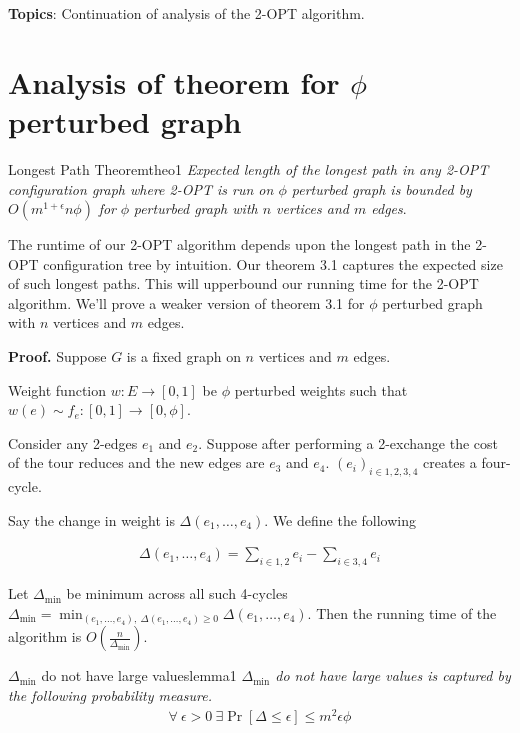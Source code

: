 \documentclass[12pt, a4paper]{article}
\begin{document}
\MakeScribeTop

\textbf{Topics}: Continuation of analysis of the 2-{\sf OPT} algorithm.

\section{Analysis of theorem for $\phi$ perturbed graph}

\begin{theo}{Longest Path Theorem}{theo1}
    \textit{Expected length of the longest path in any 2-{\sf OPT}
    configuration graph where 2-{\sf OPT} is run on $\phi$ perturbed graph
    is bounded by} $O(m^{1 + \epsilon} n \phi)$ \textit{for} $\phi$ \textit{perturbed graph
        with $n$ vertices and $m$ edges}.

\end{theo}

\noindent The runtime of our 2-{\sf OPT} algorithm depends upon the
longest path in the 2-{\sf OPT} configuration tree by intuition.
Our theorem 3.1 captures the expected size of such longest paths.
This will upperbound our running time for the 2-{\sf OPT} algorithm.
We'll prove a weaker version of theorem 3.1 for $\phi$ perturbed graph with $n$ vertices and $m$ edges.

\bigskip

\noindent \textbf{Proof.} Suppose $G$ is a fixed graph on $n$ vertices and $m$ edges.

\noindent Weight function $w:E \to [0,1]$ be $\phi$ perturbed weights such that $w(e) \sim f_e:[0,1] \to [0, \phi]$.

\noindent Consider any 2-edges $e_1$ and $e_2$. Suppose after performing a 2-exchange the cost of the tour reduces and the new edges are $e_3$ and $e_4$. $(e_i)_{i \in {1,2,3,4}}$ creates a four-cycle.

\noindent Say the change in weight is $\Delta(e_1, \dots, e_4)$. We define the following

\begin{align*}
    \Delta(e_1, \dots, e_4) = \displaystyle\sum_{i \in {1,2}} e_i - \displaystyle\sum_{i \in {3,4}} e_i
\end{align*}

\noindent Let $\Delta_{\text{min}}$ be minimum across all such 4-cycles $\Delta_{\text{min}} = \min_{(e_1, \dots, e_4), \: \Delta(e_1, \dots, e_4) \geq 0} \Delta(e_1, \dots, e_4)$.
Then the running time of the algorithm is $O(\frac{n}{\Delta_{\text{min}}})$.

\begin{lemma}{$\Delta_{\text{min}}$ do not have large values}{lemma1}
    \textit{$\Delta_{\text{min}}$ do not have large values is captured by the following probability measure.}
    \begin{align*}
        \forall \: \epsilon > 0 \: \exists \Pr[\Delta \leq \epsilon] \leq m^2 \epsilon \phi
    \end{align*}
\end{lemma}
\end{document}
